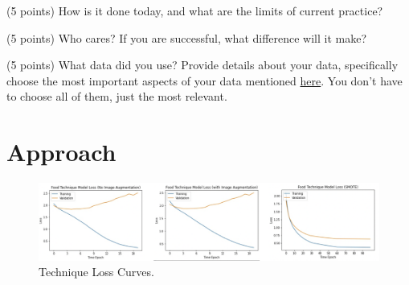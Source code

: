 \documentclass[10pt,twocolumn,letterpaper]{article}
\begin{document}
(5 points) How is it done today, and what are the limits of current practice?

(5 points) Who cares? If you are successful, what difference will it make? 

(5 points) What data did you use? Provide details about your data, specifically choose the most important aspects of your data mentioned \href{https://arxiv.org/abs/1803.09010}{here}. You don’t have to choose all of them, just the most relevant.

\section{Approach}
\begin{figure}
\begin{center}
\includegraphics[width=1.0\linewidth]{technique_model_loss_curve}
\end{center}
  \caption{Technique Loss Curves.}
\label{fig:loss_curve}
\end{figure}
\end{document}
